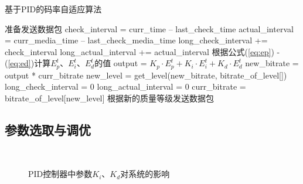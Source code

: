 \begin{algorithm}
	\caption{基于PID的码率自适应算法}
	\label{algo:control}
	\begin{algorithmic}
		\STATE 准备发送数据包
		\STATE check\_interval = curr\_time -- last\_check\_time
		\STATE actual\_interval = curr\_media\_time -- last\_check\_media\_time
		\STATE long\_check\_interval += check\_interval
		\STATE long\_actual\_interval += actual\_interval
		\STATE 根据公式(\ref{eq:ep}) - (\ref{eq:ed})计算$E_p^t$、$E_i^t$、$E_d^t$的值
		\STATE output = ${K_p} \cdot E_p^t + {K_i} \cdot E_i^t + {K_d} \cdot E_d^t$
		\STATE new\_bitrate = output * curr\_bitrate
		\STATE new\_level = get\_level(new\_bitrate, bitrate\_of\_level[])
		\STATE long\_check\_interval = 0
		\STATE long\_actual\_interval = 0
		\STATE curr\_bitrate = bitrate\_of\_level[new\_level]
		\ENDIF
		\STATE 根据新的质量等级发送数据包
	\end{algorithmic}
\end{algorithm}

\subsection{参数选取与调优}

\begin{figure}[!t]
	\centering
	 \\
	\caption{PID控制器中参数$K_i$、$K_d$对系统的影响}
	\label{fig:19}
\end{figure}

